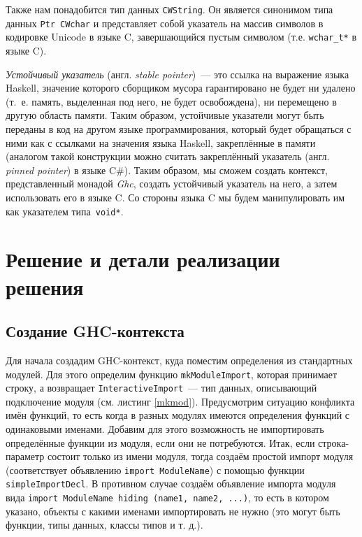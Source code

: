 	Также нам понадобится тип данных \lstinline{CWString}. Он является синонимом типа данных \lstinline{Ptr CWchar} и представляет собой указатель на массив символов в кодировке Unicode в языке C, завершающийся пустым символом (т.е. \lstinline{wchar_t*} в языке C).
	
	\textit{Устойчивый указатель} (англ. \textit{stable pointer})~--- это ссылка на выражение языка Haskell, значение которого сборщиком мусора гарантировано не будет ни удалено (т.~е. память, выделенная под него, не будет освобождена), ни перемещено в другую область памяти. Таким образом, устойчивые указатели могут быть переданы в код на другом языке программирования, который будет обращаться с ними как с ссылками на значения языка Haskell, закреплённые в памяти (аналогом такой конструкции можно считать закреплённый указатель (англ. \textit{pinned pointer}) в языке C\#). Таким образом, мы сможем создать контекст, представленный монадой \textit{Ghc}, создать устойчивый указатель на него, а затем использовать его в языке C. Со стороны языка C мы будем манипулировать им как указателем типа~\lstinline{void*}.   %

\section{Решение и детали реализации решения}
	\subsection{Создание GHC-контекста}
		Для начала создадим GHC-контекст, куда поместим определения из стандартных модулей. Для этого определим функцию \lstinline!mkModuleImport!, которая принимает строку, а возвращает \lstinline!InteractiveImport!~--- тип данных, описывающий подключение модуля (см. листинг \ref{mkmod}). Предусмотрим ситуацию конфликта имён функций, то есть когда в разных модулях имеются определения функций с одинаковыми именами. Добавим для этого возможность не импортировать определённые функции из модуля, если они не потребуются. Итак, если строка-параметр состоит только из имени модуля, тогда создаём простой импорт модуля (соответствует объявлению \lstinline!import ModuleName!) с помощью функции \lstinline!simpleImportDecl!. В противном случае создаём объявление импорта модуля вида \lstinline!import ModuleName hiding (name1, name2, ...)!, то есть в котором указано, объекты с какими именами импортировать не нужно (это могут быть функции, типы данных, классы типов и т. д.).
		
